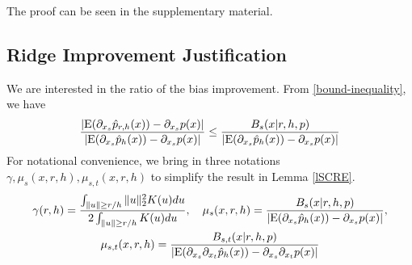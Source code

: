 \documentclass[aos,preprint]{imsart}
\theoremstyle{remark}
\begin{document}
The proof can be seen in the supplementary material. 
\subsection{Ridge Improvement Justification}
We are interested in the ratio of the bias improvement.  From \eqref{bound-inequality}, we have
\[
\frac{|{\rm E}( \partial_{x_s}  \hat{p}_{r,h}(x)) -  \partial_{x_s } p(x)|}{|{\rm E}( \partial_{x_s}  \hat{p}_{h}(x)) -  \partial_{x_s } p(x)|} \leq \frac{B_s(x| r,h, p)}{|{\rm E}( \partial_{x_s}  \hat{p}_{h}(x)) -  \partial_{x_s } p(x)|}
\]
For notational convenience, we bring in three notations $\gamma, \mu_s(x,r,h), \mu_{s,t}(x,r,h)$ to simplify the result in Lemma \ref{lSCRE}.
\begin{gather*}
\gamma(r,h) = \frac{\int_{\|u\|\geq r/h } \|u\|_2^2 K(u) du}{ 2\int_{\|u\|\geq r/h} K(u) du }, \quad
\mu_s(x,r,h) = \frac{B_s(x| r,h, p)}{|{\rm E}( \partial_{x_s}  \hat{p}_{h}(x)) -  \partial_{x_s } p(x)|},\\
\mu_{s,t}(x,r,h) = \frac{B_{s,t}(x| r,h, p)}{|{\rm E}( \partial_{x_s}\partial_{x_t}  \hat{p}_{h}(x)) -  \partial_{x_s } \partial_{x_t}p(x)|}
\end{gather*}
\end{document}
